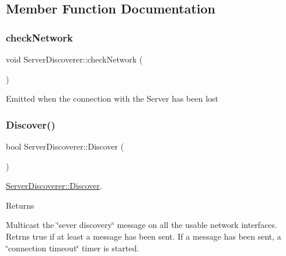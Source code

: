 \subsection{Member Function Documentation}
\mbox{\label{classServerDiscoverer_a2d1f3cada3f32eb84efa7c871d7c697a}} 
\subsubsection{\texorpdfstring{check\+Network}{checkNetwork}}
{\footnotesize\ttfamily void Server\+Discoverer\+::check\+Network (\begin{DoxyParamCaption}{ }\end{DoxyParamCaption})\hspace{0.3cm}{\ttfamily [signal]}}

Emitted when the connection with the Server has been lost \mbox{\label{classServerDiscoverer_ae1bf2c4219f5e7510ab970ac66542606}} 
\subsubsection{\texorpdfstring{Discover()}{Discover()}}
{\footnotesize\ttfamily bool Server\+Discoverer\+::\+Discover (\begin{DoxyParamCaption}{ }\end{DoxyParamCaption})}



\mbox{\hyperlink{classServerDiscoverer_ae1bf2c4219f5e7510ab970ac66542606}{Server\+Discoverer\+::\+Discover}}. 

\begin{DoxyReturn}{Returns}

\end{DoxyReturn}
Multicast the \char`\"{}sever discovery\char`\"{} message on all the usable network interfaces. Retrns true if at least a message has been sent. If a message has been sent, a \char`\"{}connection timeout\char`\"{} timer is started. \mbox{\label{classServerDiscoverer_a7ee703cbd453780cce0d778f37cc5210}} 
